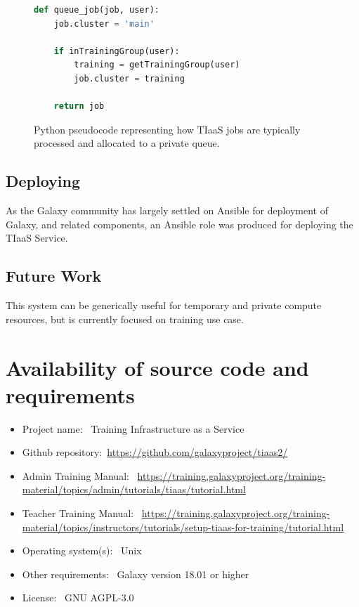 \documentclass[a4paper,num-refs]{oup-contemporary}
\begin{document}
\begin{figure}[!ht]
\centering
\begin{lstlisting}[frame=single,language=Python]  % Start your code-block
def queue_job(job, user):
    job.cluster = 'main'

    if inTrainingGroup(user):
        training = getTrainingGroup(user)
        job.cluster = training

    return job
\end{lstlisting}
\caption{Python pseudocode representing how TIaaS jobs are typically processed and allocated to a private queue.\label{code:scheduler}}
\end{figure}

\subsection{Deploying}
As the Galaxy community has largely settled on Ansible for deployment of Galaxy, and related components, an Ansible role was produced for deploying the TIaaS Service.

\subsection{Future Work}
 This system can be generically useful for temporary and private compute resources, but is currently focused on training use case.

\section{Availability of source code and requirements}

\begin{itemize}
\item Project name: ~Training Infrastructure as a Service
\item Github repository:~\url{https://github.com/galaxyproject/tiaas2/}
\item Admin Training Manual: ~\url{https://training.galaxyproject.org/training-material/topics/admin/tutorials/tiaas/tutorial.html}
\item Teacher Training Manual: ~\url{https://training.galaxyproject.org/training-material/topics/instructors/tutorials/setup-tiaas-for-training/tutorial.html}
\item Operating system(s): ~Unix
\item Other requirements: ~Galaxy version 18.01 or higher
\item License: ~GNU AGPL-3.0
\end{itemize}
\end{document}
